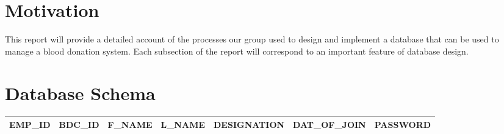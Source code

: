




\section{Motivation}

This report will provide a detailed account of the processes our group
used to design and implement a database that can be used to manage
a blood donation system. Each subsection of the report will correspond to an
important feature of database design.

\section{Database Schema}

\begin{tabular}{ | c | c | c | c | c | c | c | }
 \hline
 EMP_ID & BDC_ID & F_NAME & L_NAME & DESIGNATION & DAT_OF_JOIN & PASSWORD \\
 \hline
\end{tabular}

